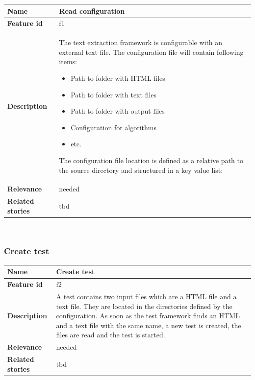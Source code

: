 	\begin{tabular}{ | p{3cm} | p{12cm} |}
	\hline
	\textbf{Name} 				& Read configuration 				\\ \hline
	\textbf{Feature id} 		& f1 				\\ \hline
	\textbf{Description} 		& The text extraction framework is configurable with an external text file. The configuration file will contain following items:
							        \begin{itemize}
							        \item Path to folder with HTML files
							        \item Path to folder with text files
							        \item Path to folder with output files
							        \item Configuration for algorithms
							        \item etc.
						        \end{itemize} 
						        The configuration file location is defined as a relative path to the source directory and structured in a key value list: 

						         \\ \hline
	\textbf{Relevance} 			& needed 			\\ \hline
	\textbf{Related stories} 	& tbd		\\ \hline
	\end{tabular} \\

\subsubsection{Create test}
\label{subsec:Create test}

	\begin{tabular}{ | p{3cm} | p{12cm} |}
	\hline
	\textbf{Name} 				& Create test \\ \hline
	\textbf{Feature id} 		& f2 \\ \hline
	\textbf{Description} 		& A test contains two input files which are a HTML file and a text file. They are located in the directories defined by the configuration. As soon as the test framework finds an HTML and a text file with the same name, a new test is created, the files are read and the test is started.\\ \hline
	\textbf{Relevance} 			& needed \\ \hline
	\textbf{Related stories} 	& tbd \\ \hline
	\end{tabular} \\

